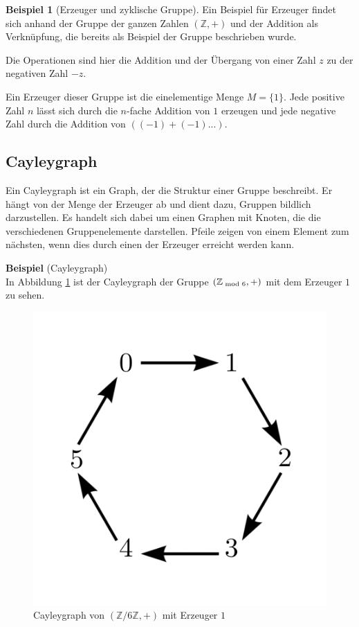 \documentclass[12pt,a4paper, usenames, dvipsnames]{article}
\theoremstyle{mystyle}
\theoremstyle{definition}
\newtheorem{bsp}{Beispiel}[definition]
\begin{document}
\begin{bsp}[Erzeuger und zyklische Gruppe]

Ein Beispiel für Erzeuger findet sich anhand der Gruppe der ganzen Zahlen $(\mathbb{Z},+)$ und der Addition als Verknüpfung, die bereits als Beispiel der Gruppe beschrieben wurde.

Die Operationen sind hier die Addition und der Übergang von einer Zahl $z$ zu der negativen Zahl $-z$.

Ein Erzeuger dieser Gruppe ist die einelementige Menge $M = \{ 1 \}$. Jede positive Zahl $n$ lässt sich durch die $n$-fache Addition von $1$ erzeugen und jede negative Zahl durch  die Addition von $((-1)+(-1)...)$. 

\end{bsp}
%
%
%
%
%
%
%
%
%
\subsection{Cayleygraph} 
\label{Abschnitt_Cayleygraph}
Ein Cayleygraph ist ein Graph, der die Struktur einer Gruppe beschreibt. Er hängt von der Menge der Erzeuger ab und dient dazu, Gruppen bildlich darzustellen.
Es handelt sich dabei um einen Graphen mit Knoten, die die verschiedenen Gruppenelemente darstellen. Pfeile zeigen von einem Element zum nächsten, wenn dies durch einen der Erzeuger erreicht werden kann. \cite{AT}

\textbf{Beispiel} (Cayleygraph) \\
In Abbildung \ref{Abbildung_Cayleygraph} ist der Cayleygraph der Gruppe $(\mathbb{Z}_{\hspace*{-0.3em}\mod 6}, +)$ mit dem Erzeuger $1$ zu sehen.

\begin{figure}[H]
\centering
\includegraphics[scale=0.7]{Cayleygraph3.png}
\caption{Cayleygraph von $(\mathbb{Z}/6\mathbb{Z}, +)$ mit Erzeuger $1$}
\label{Abbildung_Cayleygraph}
\end{figure}
\end{document}
